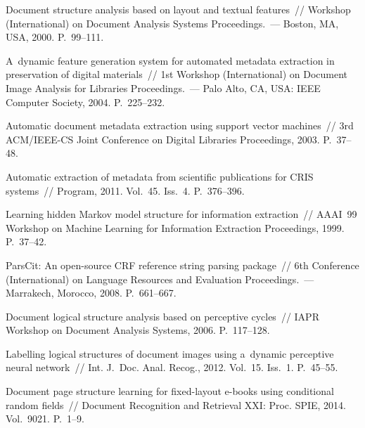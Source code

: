 \begin{multicols}{2}
{{\begin{thebibliography}{99}
 Document structure analysis 
based on layout and textual features~//  Workshop (International) on 
Document Analysis Systems Proceedings.~---
        Boston, MA, USA, 2000. P.~99--111.

     A~dynamic feature generation 
system for automated metadata extraction in preservation of digital materials~// 
1st  Workshop (International) on Document Image Analysis for 
Libraries Proceedings.~--- Palo Alto, CA, USA: IEEE Computer Society, 2004. P.~225--232.
    
Automatic document metadata extraction using support vector machines~// 
3rd ACM/IEEE-CS Joint Conference on Digital Libraries Proceedings, 2003. 
P.~37--48.

Automatic extraction of metadata from scientific publications for CRIS systems~// 
Program, 2011. Vol.~45. Iss.~4. P.~376--396.

 Learning hidden Markov model 
structure for information extraction~// AAAI~99 Workshop on 
Machine Learning for Information Extraction Proceedings, 1999. P.~37--42.

 ParsCit: An open-source CRF 
reference string parsing package~// 6th Conference 
(International) on Language Resources and Evaluation Proceedings.~---
Marrakech, Morocco, 2008. P.~661--667.


 Document logical structure analysis based on 
perceptive cycles~// IAPR Workshop on Document Analysis Systems, 2006. P.~117--128.

 Labelling logical structures of 
document images using a~dynamic perceptive neural network~// Int. 
J.~Doc. Anal. Recog., 2012. Vol.~15. Iss.~1. P.~45--55.

 Document page structure learning for fixed-layout 
e-books using conditional random fields~// 
 Document Recognition and Retrieval XXI:
 Proc. SPIE, 2014. 
Vol.~9021. P.~1--9.


\end{thebibliography}}}
\end{multicols}
